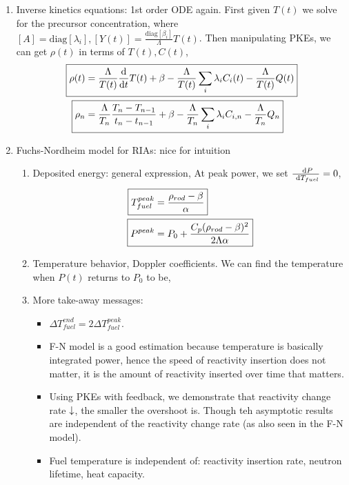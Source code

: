 \documentclass{school-22.211-notes}
\begin{document}
\begin{enumerate}
\item Inverse kinetics equations: 1st order ODE again. First given $T(t)$ we solve for the precursor concentration,
where $[A] = \mathrm{diag}[\lambda_i], [Y(t)] = \frac{\mathrm{diag}[\beta_i]}{\Lambda} T(t)$. Then manipulating PKEs, we can get $\rho(t)$ in terms of $T(t), C(t)$, 
\begin{align}
\Aboxed{\rho(t) &= \frac{\Lambda}{T(t)} \ddt T(t) + \beta - \frac{\Lambda}{T(t)} \Sum_i \lambda_i C_i(t) - \frac{\Lambda}{T(t)} Q(t) } \\
\Aboxed{ \rho_n &= \frac{\Lambda}{T_n} \frac{T_n - T_{n-1}}{t_n - t_{n-1}} + \beta - \frac{\Lambda}{T_n} \Sum_i \lambda_i C_{i,n} - \frac{\Lambda}{T_n} Q_n } 
\end{align}

\item Fuchs-Nordheim model for RIAs: nice for intuition
  \begin{enumerate}
    \item Deposited energy: general expression, 
      At peak power, we set $\frac{\mbox{ }\mathrm{d} P}{\mbox{ }\mathrm{d} T_{fuel}} = 0$, 
      \begin{align}
        \Aboxed{ T_{fuel}^{peak} &= \frac{\rho_{rod} - \beta}{\alpha} } \\
        \Aboxed{ P^{peak} &= P_0 + \frac{C_p (\rho_{rod} - \beta)^2}{2 \Lambda \alpha} }
      \end{align}

    \item Temperature behavior, Doppler coefficients. We can find the temperature when $P(t)$ returns to $P_0$ to be,     

    \item More take-away messages:
      \begin{itemize}
      \item $\Delta T_{fuel}^{end} = 2 \Delta T_{fuel}^{peak}$. 
      \item F-N model is a good estimation because temperature is basically integrated power, hence the speed of reactivity insertion does not matter, it is the amount of reactivity inserted over time that matters. 
      \item Using PKEs with feedback, we demonstrate that reactivity change rate $\downarrow$, the smaller the overshoot is. Though teh asymptotic results are independent of the reactivity change rate (as also seen in the F-N model). 
      \item Fuel temperature is independent of: reactivity insertion rate, neutron lifetime, heat capacity. 
      \end{itemize}
  \end{enumerate}


\end{enumerate}
\end{document}
